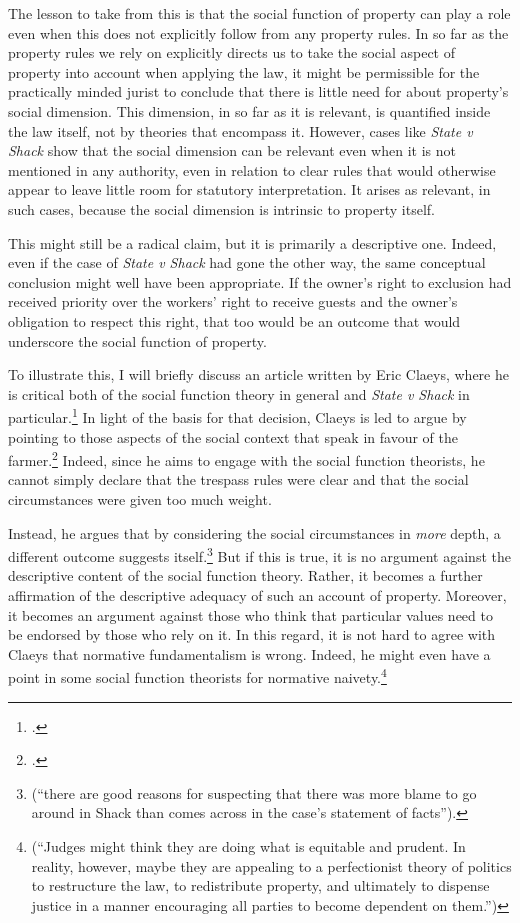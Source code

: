 The lesson to take from this is that the social function of property can play a role even when this does not explicitly follow from any property rules. In so far as the property rules we rely on explicitly directs us to take the social aspect of property into account when applying the law, it might be permissible for the practically minded jurist to conclude that there is little need for  about property's social dimension. This dimension, in so far as it is relevant, is quantified inside the law itself, not by theories that encompass it. However, cases like {\it State v Shack} show that the social dimension can be relevant even when it is not mentioned in any authority, even in relation to clear rules that would otherwise appear to leave little room for statutory interpretation. It arises as relevant, in such cases, because the social dimension is intrinsic to property itself.

This might still be a radical claim, but it is primarily a descriptive one. Indeed, even if the case of {\it State v Shack} had gone the other way, the same conceptual conclusion might well have been appropriate. If the owner's right to exclusion had received priority over the workers' right to receive guests and the owner's obligation to respect this right, that too would be an outcome that would underscore the social function of property. 

To illustrate this, I will briefly discuss an article written by Eric Claeys, where he is critical both of the social function theory in general and {\it State v Shack} in particular.\footcite{claeys09} In light of the basis for that decision, Claeys is led to argue by pointing to those aspects of the social context that speak in favour of the farmer.\footnote{\cite[941-942]{claeys09}.} Indeed, since he aims to engage with the social function theorists, he cannot simply declare that the trespass rules were clear and that the social circumstances were given too much weight.

Instead, he argues that by considering the social circumstances in {\it more} depth, a different outcome suggests itself.\footnote{\cite[941]{claeys09} (``there are good reasons for suspecting that there was more blame to go around in Shack than comes across in the case's statement of facts'').} But if this is true, it is no argument against the descriptive content of the social function theory. Rather, it becomes a further affirmation of the descriptive adequacy of such an account of property. Moreover, it becomes an argument against those who think that particular values need to be endorsed by those who rely on it. In this regard, it is not hard to agree with Claeys that normative fundamentalism is wrong. Indeed, he might even have a point in  some social function theorists for normative naivety.\footnote{\cite[945]{claeys09} (``Judges might think they are doing what is equitable and prudent. In reality, however, maybe they are appealing to a perfectionist theory of politics to restructure the law, to redistribute property, and ultimately to dispense justice in a manner encouraging all parties to become dependent on them.'')} 

